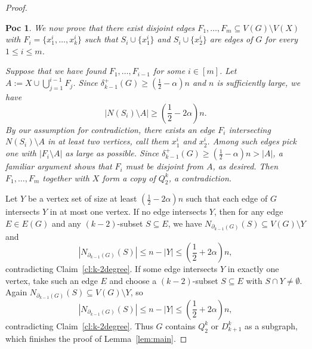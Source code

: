 \documentclass[10pt,a4paper]{amsart}
\newtheorem{poc}{Poc}
\begin{document}
\begin{proof}
\begin{poc}
    We now prove that there exist disjoint edges $F_1,\dots,F_m\subseteq V(G)\setminus V(X)$ with $F_i=\{x_1^i,\dots,x_k^i\}$ such that $S_i\cup\{x_1^i\}$ and $S_i\cup\{x_2^i\}$ are edges of $G$ for every $1\le i\le m$.
    
    Suppose that we have found $F_1,\dots,F_{i-1}$ for some $i\in[m]$. Let $A:=X\cup\bigcup_{j=1}^{i-1}F_j$. Since $\delta_{k-1}^+(G)\ge\left(\frac{1}{2}-\alpha\right)n$ and $n$ is sufficiently large, we have
    \[
    \left|N(S_i)\setminus A\right|\ge\left(\frac{1}{2}-2\alpha\right)n.
    \]
    By our assumption for contradiction, there exists an edge $F_i$ intersecting $N(S_i)\setminus A$ in at least two vertices, call them $x_1^i$ and $x_2^i$. Among such edges pick one with $|F_i\setminus A|$ as large as possible. Since $\delta_{k-1}^+(G)\ge\left(\frac{1}{2}-\alpha\right)n>|A|$, a familiar argument shows that $F_i$ must be disjoint from $A$, as desired.
    Then $F_1,\dots,F_m$ together with $X$ form a copy of $Q_2^k$, a contradiction.
   \end{poc}
   Let $Y$ be a vertex set of size at least $\left(\frac{1}{2}-2\alpha\right)n$ such that each edge of $G$ intersects $Y$ in at most one vertex.
   If no edge intersects $Y$, then for any edge $E\in E(G)$ and any $(k-2)$-subset $S\subseteq E$, we have $N_{\partial_{k-1}(G)}(S)\subseteq V(G)\setminus Y$ and
   \[
   |N_{\partial_{k-1}(G)}(S)|\le n-|Y|\le\left(\frac{1}{2}+2\alpha\right)n,
   \]
   contradicting Claim~\ref{cl:k-2degree}.
   If some edge intersects $Y$ in exactly one vertex, take such an edge $E$ and choose a $(k-2)$-subset $S\subseteq E$ with $S\cap Y\neq\emptyset$. Again $N_{\partial_{k-1}(G)}(S)\subseteq V(G)\setminus Y$, so
   \[
   |N_{\partial_{k-1}(G)}(S)|\le n-|Y|\le\left(\frac{1}{2}+2\alpha\right)n,
   \]
   contradicting Claim~\ref{cl:k-2degree}. 
   Thus $G$ contains $Q_2^k$ or $D_{k+1}^k$ as a subgraph, which finishes the proof of Lemma~\ref{lem:main}.
\end{proof}
\end{document}
